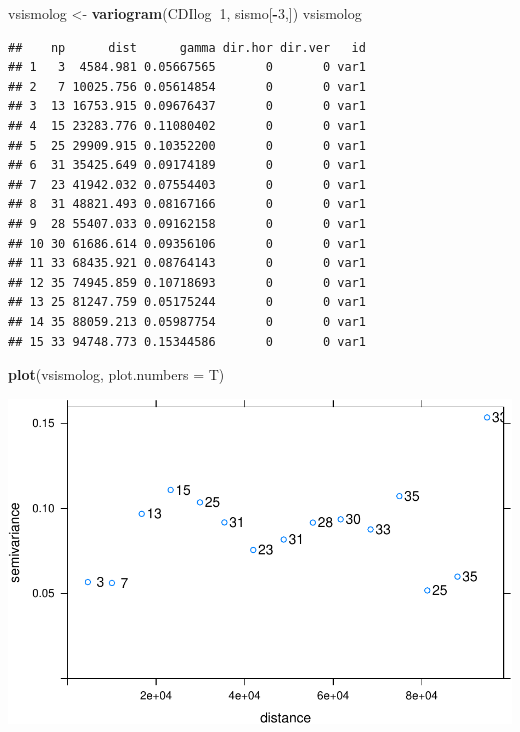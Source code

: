 \documentclass[11pt,]{article}
\newenvironment{Shaded}{\begin{snugshade}}{\end{snugshade}}
\newcommand{\KeywordTok}[1]{\textcolor[rgb]{0.13,0.29,0.53}{\textbf{#1}}}
\newcommand{\DataTypeTok}[1]{\textcolor[rgb]{0.13,0.29,0.53}{#1}}
\newcommand{\DecValTok}[1]{\textcolor[rgb]{0.00,0.00,0.81}{#1}}
\newcommand{\StringTok}[1]{\textcolor[rgb]{0.31,0.60,0.02}{#1}}
\newcommand{\OperatorTok}[1]{\textcolor[rgb]{0.81,0.36,0.00}{\textbf{#1}}}
\newcommand{\NormalTok}[1]{#1}
\begin{document}
\begin{Shaded}
\begin{Highlighting}[]
\NormalTok{vsismolog <-}\StringTok{ }\KeywordTok{variogram}\NormalTok{(CDIlog}\OperatorTok{~}\DecValTok{1}\NormalTok{, sismo[}\OperatorTok{-}\DecValTok{3}\NormalTok{,])}
\NormalTok{vsismolog}
\end{Highlighting}
\end{Shaded}

\begin{verbatim}
##    np      dist      gamma dir.hor dir.ver   id
## 1   3  4584.981 0.05667565       0       0 var1
## 2   7 10025.756 0.05614854       0       0 var1
## 3  13 16753.915 0.09676437       0       0 var1
## 4  15 23283.776 0.11080402       0       0 var1
## 5  25 29909.915 0.10352200       0       0 var1
## 6  31 35425.649 0.09174189       0       0 var1
## 7  23 41942.032 0.07554403       0       0 var1
## 8  31 48821.493 0.08167166       0       0 var1
## 9  28 55407.033 0.09162158       0       0 var1
## 10 30 61686.614 0.09356106       0       0 var1
## 11 33 68435.921 0.08764143       0       0 var1
## 12 35 74945.859 0.10718693       0       0 var1
## 13 25 81247.759 0.05175244       0       0 var1
## 14 35 88059.213 0.05987754       0       0 var1
## 15 33 94748.773 0.15344586       0       0 var1
\end{verbatim}

\begin{Shaded}
\begin{Highlighting}[]
\KeywordTok{plot}\NormalTok{(vsismolog, }\DataTypeTok{plot.numbers =}\NormalTok{ T)}
\end{Highlighting}
\end{Shaded}

\includegraphics{proyecto_files/figure-latex/unnamed-chunk-25-2.pdf}
\end{document}
